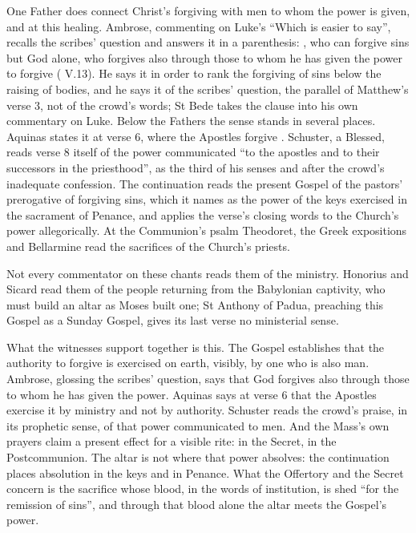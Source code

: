 One Father does connect Christ's forgiving with men to whom the power is given,
and at this healing. Ambrose, commenting on Luke's ``Which is easier to say'',
recalls the scribes' question and answers it in a parenthesis: , who can forgive sins but God alone, who
forgives also through those to whom he has given the power to forgive
( V.13). He says it in order to rank the forgiving of
sins below the raising of bodies, and he says it of the scribes' question, the
parallel of Matthew's verse 3, not of the crowd's words; St Bede takes the
clause into his own commentary on Luke. Below the Fathers the sense stands in
several places. Aquinas states it at verse 6, where the Apostles forgive
. Schuster, a Blessed, reads
verse 8 itself of the power communicated ``to the apostles and to their
successors in the priesthood'', as the third of his senses and after the
crowd's inadequate confession. The continuation reads the present Gospel of the
pastors' prerogative of forgiving sins, which it names as the power of the keys
exercised in the sacrament of Penance, and applies the verse's closing words to
the Church's power allegorically. At the Communion's psalm Theodoret, the Greek
expositions and Bellarmine read the sacrifices of the Church's priests.

Not every commentator on these chants reads them of the ministry. Honorius and
Sicard read them of the people returning from the Babylonian captivity, who must
build an altar as Moses built one; St Anthony of
Padua, preaching this Gospel as a Sunday Gospel, gives its last verse no
ministerial sense.

What the witnesses support together is this. The Gospel establishes that the
authority to forgive is exercised on earth, visibly, by one who is also man.
Ambrose, glossing the scribes' question, says that God forgives also through
those to whom he has given the power. Aquinas says at verse 6 that the Apostles
exercise it by ministry and not by authority. Schuster reads the crowd's
praise, in its prophetic sense, of that power communicated to men. And the
Mass's own prayers claim a present effect for a visible rite: 
in the Secret,  in the Postcommunion. The altar is not where
that power absolves: the continuation places absolution in the keys and in
Penance. What the Offertory and the Secret concern is the sacrifice whose
blood, in the words of institution, is shed ``for the remission of sins'', and
through that blood alone the altar meets the Gospel's power.

